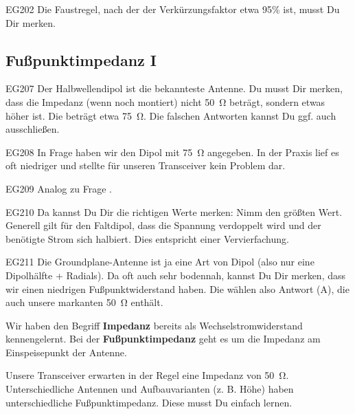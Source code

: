 \begin{sol}{EG202}
 Die Faustregel, nach der der Verkürzungsfaktor etwa 95\% ist, musst Du Dir merken.
\end{sol}

\subsection{Fußpunktimpedanz I}

\begin{sol}{EG207}
Der Halbwellendipol ist die bekannteste Antenne. Du musst Dir merken, dass die Impedanz (wenn noch montiert) nicht \SI{50}{\ohm} beträgt, sondern etwas höher ist.
Die beträgt etwa \SI{75}{\ohm}. Die falschen Antworten kannst Du ggf. auch ausschließen.
\end{sol}

\begin{sol}{EG208}
    In Frage  haben wir den Dipol mit \SI{75}{\ohm} angegeben. In der Praxis lief es oft niedriger und stellte für unseren Transceiver kein Problem dar.
\end{sol}

\begin{sol}{EG209}
    Analog zu Frage .
\end{sol}

\begin{sol}{EG210}
    Da kannst Du Dir die richtigen Werte merken: Nimm den größten Wert. Generell gilt für den Faltdipol, dass die Spannung verdoppelt wird und der benötigte Strom sich halbiert. Dies entspricht einer Vervierfachung.
\end{sol}

\begin{sol}{EG211}
    Die Groundplane-Antenne ist ja eine Art von Dipol (also nur eine Dipolhälfte + Radials). Da oft auch sehr bodennah, kannst Du Dir merken, dass wir einen niedrigen Fußpunktwiderstand haben. Die wählen also Antwort (A), die auch unsere markanten \SI{50}{\ohm} enthält.
\end{sol}


\begin{ohmchapter}
Wir haben den Begriff \textbf{Impedanz} bereits als Wechselstromwiderstand kennengelernt.
Bei der \textbf{Fußpunktimpedanz} geht es um die Impedanz am Einspeisepunkt der Antenne.

Unsere Transceiver erwarten in der Regel eine Impedanz von \SI{50}{\ohm}.
Unterschiedliche Antennen und Aufbauvarianten (z. B. Höhe) haben unterschiedliche Fußpunktimpedanz. Diese musst Du einfach lernen.

\end{ohmchapter}


